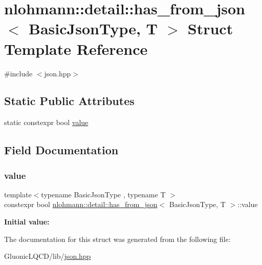 \hypertarget{structnlohmann_1_1detail_1_1has__from__json}{}\section{nlohmann\+::detail\+::has\+\_\+from\+\_\+json$<$ Basic\+Json\+Type, T $>$ Struct Template Reference}
\label{structnlohmann_1_1detail_1_1has__from__json}


{\ttfamily \#include $<$json.\+hpp$>$}

\subsection*{Static Public Attributes}
\begin{DoxyCompactItemize}
\item 
static constexpr bool \mbox{\hyperlink{structnlohmann_1_1detail_1_1has__from__json_a16701d806343c58ae7e884024dd14955}{value}}
\end{DoxyCompactItemize}


\subsection{Field Documentation}
\mbox{\label{structnlohmann_1_1detail_1_1has__from__json_a16701d806343c58ae7e884024dd14955}} 
\subsubsection{\texorpdfstring{value}{value}}
{\footnotesize\ttfamily template$<$typename Basic\+Json\+Type , typename T $>$ \\
constexpr bool \mbox{\hyperlink{structnlohmann_1_1detail_1_1has__from__json}{nlohmann\+::detail\+::has\+\_\+from\+\_\+json}}$<$ Basic\+Json\+Type, T $>$\+::value\hspace{0.3cm}{\ttfamily [static]}}

{\bfseries Initial value\+:}
\begin{DoxyCode}{0}

\end{DoxyCode}


The documentation for this struct was generated from the following file\+:\begin{DoxyCompactItemize}
\item 
Gluonic\+L\+Q\+C\+D/lib/\mbox{\hyperlink{json_8hpp}{json.\+hpp}}\end{DoxyCompactItemize}
